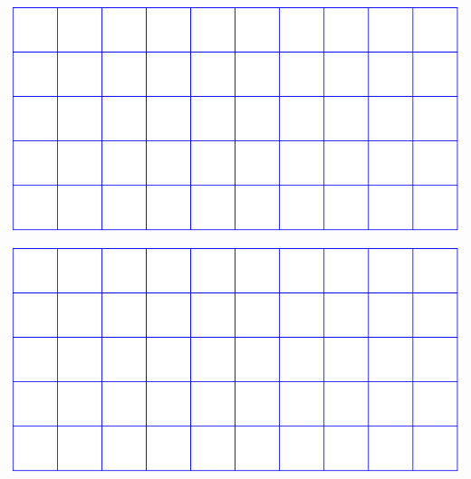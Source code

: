 \documentclass[12pt,ngerman]{beamer}
\begin{document}
\begin{frame}

\includegraphics[width=\textwidth,page=1]{multi-tikz}

\end{frame}

\begin{frame}

\includegraphics[width=\textwidth,page=2]{multi-tikz}

\end{frame}
\end{document}
